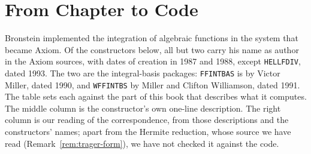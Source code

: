 \chapter{From Chapter to Code}\label{app:code}

Bronstein implemented the integration of algebraic functions in the system
that became Axiom. Of the constructors below, all but two carry his name as
author in the Axiom sources, with dates of creation in 1987 and 1988, except
\texttt{HELLFDIV}, dated 1993. The two are the integral-basis packages:
\texttt{FFINTBAS} is by Victor Miller, dated 1990, and \texttt{WFFINTBS} by
Miller and Clifton Williamson, dated 1991. The table
sets each against the part of this book that describes what it computes.
The middle column is the constructor's own one-line description. The right
column is our reading of the correspondence, from those descriptions and
the constructors' names; apart from the Hermite reduction, whose source we
have read (Remark~\ref{rem:trager-form}), we have not checked it against
the code.

